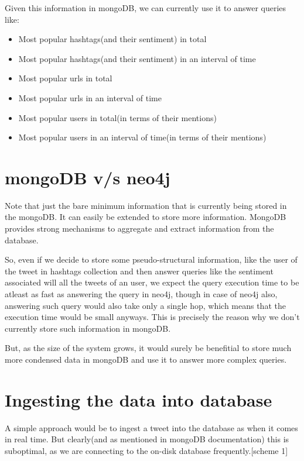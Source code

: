 \documentclass[letterpaper,10pt,english]{sphinxmanual}
\begin{document}
Given this information in mongoDB, we can currently use it to answer queries like:
\begin{itemize}
\item {} 
Most popular hashtags(and their sentiment) in total

\item {} 
Most popular hashtags(and their sentiment) in an interval of time

\item {} 
Most popular urls in total

\item {} 
Most popular urls in an interval of time

\item {} 
Most popular users in total(in terms of their mentions)

\item {} 
Most popular users in an interval of time(in terms of their mentions)

\end{itemize}


\section{mongoDB v/s neo4j}
\label{\detokenize{mongoDB_data_ingestion:mongodb-v-s-neo4j}}
Note that just the bare minimum information that is currently being stored in the mongoDB. It can easily be extended to store more information. MongoDB provides strong mechanisms to aggregate and extract information
from the database.

So, even if we decide to store some pseudo-structural information, like the user of the tweet in hashtags collection and then answer queries like the sentiment associated will all the tweets of an user, we expect the query execution time to be atleast as fast as answering the query in neo4j, though in case of neo4j also, answering such query would also take only a single hop, which means that the execution time would be small anyways. This is precisely the reason why we don’t currently store such information in mongoDB.

But, as the size of the system grows, it would surely be benefitial to store much more condensed data in mongoDB and use it to answer more complex queries.


\section{Ingesting the data into database}
\label{\detokenize{mongoDB_data_ingestion:ingesting-the-data-into-database}}
A simple approach would be to ingest a tweet into the database as when it comes in real time. But clearly(and as mentioned in mongoDB documentation)
this is suboptimal, as we are connecting to the on-disk database frequently.{[}scheme 1{]}
\end{document}
